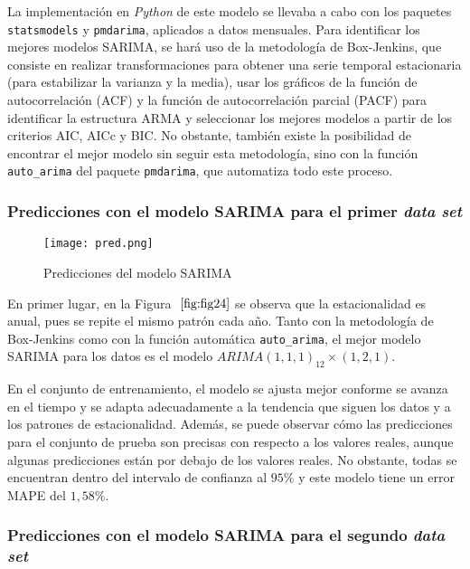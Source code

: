 \documentclass[12pt,twoside]{article}
\begin{document}
La implementación en \textit{Python} de este modelo se llevaba a cabo con los paquetes \texttt{statsmodels} y  \texttt{pmdarima}, aplicados a datos mensuales. Para identificar los mejores modelos SARIMA, se hará uso de la metodología de Box-Jenkins, que consiste en realizar transformaciones para obtener una serie temporal estacionaria (para estabilizar la varianza y la media), usar los gráficos de la función de autocorrelación (ACF) y la función de autocorrelación parcial (PACF) para identificar la estructura ARMA y seleccionar los mejores modelos a partir de los criterios AIC, AICc y BIC. No obstante, también existe la posibilidad de encontrar el mejor modelo sin seguir esta metodología, sino con la función \texttt{auto\_arima} del paquete \texttt{pmdarima}, que automatiza todo este proceso.

\subsubsection{Predicciones con el modelo SARIMA para el primer \textit{data set}}\label{sec:36}

\begin{figure}[h]
    \centering
    \texttt{[image: pred.png]}
    \caption{Predicciones del modelo SARIMA} 
    \label{fig:fig24}
\end{figure}

En primer lugar, en la Figura $~\ref{fig:fig24}$ se observa que la estacionalidad es anual, pues se repite el mismo patrón cada año. Tanto con la metodología de Box-Jenkins como con la función automática \texttt{auto\_arima}, el mejor modelo SARIMA para los datos es el modelo $ARIMA(1,1,1)_{12} \times (1,2,1)$.

En el conjunto de entrenamiento, el modelo se ajusta mejor conforme se avanza en el tiempo y se adapta adecuadamente a la tendencia que siguen los datos y a los patrones de estacionalidad. Además, se puede observar cómo las predicciones para el conjunto de prueba son precisas con respecto a los valores reales, aunque algunas predicciones están por debajo de los valores reales. No obstante, todas se encuentran dentro del intervalo de confianza al $95\%$ y este modelo tiene un error MAPE del $1,58\%$. 

\subsubsection{Predicciones con el modelo SARIMA para el segundo \textit{data set}}\label{sec:37}
\end{document}
